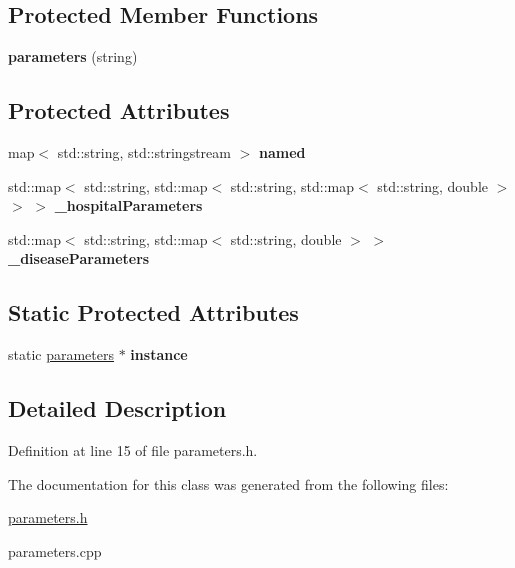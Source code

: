 \subsection*{Protected Member Functions}
\begin{DoxyCompactItemize}
\item 
\mbox{\label{classparameters_ab172d29c480f616c125b126fd7ea34d6}} 
{\bfseries parameters} (string)
\end{DoxyCompactItemize}
\subsection*{Protected Attributes}
\begin{DoxyCompactItemize}
\item 
\mbox{\label{classparameters_a2ab9d29b33ee487a519f300b363cce3b}} 
map$<$ std\+::string, std\+::stringstream $>$ {\bfseries named}
\item 
\mbox{\label{classparameters_a4c0787e1340a7564206348efd80cf507}} 
std\+::map$<$ std\+::string, std\+::map$<$ std\+::string, std\+::map$<$ std\+::string, double $>$ $>$ $>$ {\bfseries \+\_\+hospital\+Parameters}
\item 
\mbox{\label{classparameters_a3ddb7a78e3dddb388a8a7029f5ef5ac5}} 
std\+::map$<$ std\+::string, std\+::map$<$ std\+::string, double $>$ $>$ {\bfseries \+\_\+disease\+Parameters}
\end{DoxyCompactItemize}
\subsection*{Static Protected Attributes}
\begin{DoxyCompactItemize}
\item 
\mbox{\label{classparameters_abc1d17f187dfc52b3de807d863e94390}} 
static \mbox{\hyperlink{classparameters}{parameters}} $\ast$ {\bfseries instance}
\end{DoxyCompactItemize}


\subsection{Detailed Description}


Definition at line 15 of file parameters.\+h.



The documentation for this class was generated from the following files\+:\begin{DoxyCompactItemize}
\item 
\mbox{\hyperlink{parameters_8h}{parameters.\+h}}\item 
parameters.\+cpp\end{DoxyCompactItemize}

